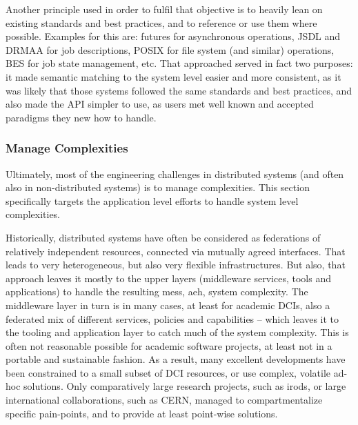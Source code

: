 \documentclass[a4paper,12pt]{article}
\begin{document}
    Another principle used in order to fulfil that objective is to
    heavily lean on existing standards and best practices, and to
    reference or use them where possible.  Examples for this are:
    futures for asynchronous operations, JSDL and DRMAA for job
    descriptions, POSIX for file system (and similar) operations, BES
    for job state management, etc.  That approached served in fact two
    purposes: it made semantic matching to the system level easier and
    more consistent, as it was likely that those systems followed the
    same standards and best practices, and also made the API simpler
    to use, as users met well known and accepted paradigms they new
    how to handle.


   \subsubsection*{Manage Complexities}

    

    Ultimately, most of the engineering challenges in distributed
    systems (and often also in non-distributed systems) is to manage
    complexities.  This section specifically targets the application
    level efforts to handle system level complexities.

    Historically, distributed systems have often be considered as
    federations of relatively independent resources, connected via
    mutually agreed interfaces.  That leads to very heterogeneous, but
    also very flexible infrastructures.  But also, that approach
    leaves it mostly to the upper layers (middleware services, tools
    and applications) to handle the resulting mess, aeh, system
    complexity.  The middleware layer in turn is in many cases, at
    least for academic DCIs, also a federated mix of different
    services, policies and capabilities -- which leaves it to the
    tooling and application layer to catch much of the system
    complexity.  This is often not reasonable possible for academic
    software projects, at least not in a portable and sustainable
    fashion.  As a result, many excellent developments have been
    constrained to a small subset of DCI resources, or use complex,
    volatile ad-hoc solutions.  Only comparatively large research
    projects, such as irods, or large international collaborations,
    such as CERN, managed to compartmentalize specific pain-points,
    and to provide at least point-wise solutions.
\end{document}
